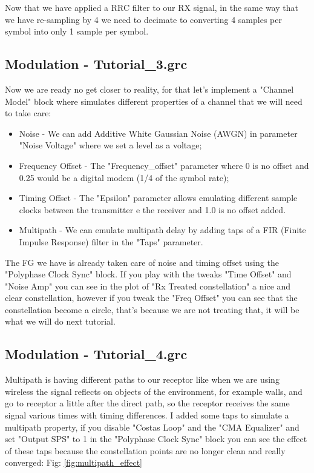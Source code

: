 \documentclass[a4paper, 10pt, conference]{ieeeconf}      %
\begin{document}
    Now that we have applied a RRC filter to our RX signal, in the same way that we have re-sampling by 4 we need to decimate to converting 4 samples per symbol into only 1 sample per symbol.

\subsection{Modulation - Tutorial\_3.grc}
    Now we are ready no get closer to reality, for that let's implement a "Channel Model" block where simulates different properties of a channel that we will need to take care:
    
\begin{itemize}
\item Noise - We can add Additive White Gaussian Noise (AWGN) in parameter "Noise Voltage" where we set a level as a voltage;
\item Frequency Offset - The "Frequency\_offset" parameter where 0 is no offset and 0.25 would be a digital modem (1/4 of the symbol rate);
\item Timing Offset - The "Epsilon" parameter allows emulating different sample clocks between the transmitter e the receiver and 1.0 is no offset added.
\item Multipath - We can emulate multipath delay by adding taps of a FIR (Finite Impulse Response) filter in the "Taps" parameter.
\end{itemize}
    
    
    The FG we have is already taken care of noise and timing offset using the "Polyphase Clock Sync" block. If you play with the tweaks "Time Offset" and "Noise Amp" you can see in the plot of "Rx Treated constellation" a nice and clear constellation, however if you tweak the "Freq Offset" you can see that the constellation become a circle, that's because we are not treating that, it will be what we will do next tutorial.
    
\subsection{Modulation - Tutorial\_4.grc}
    Multipath is having different paths to our receptor like when we are using wireless the signal  reflects on objects of the environment, for example walls, and go to receptor a little after the direct path, so the receptor receives the same signal various times with timing differences. 
    I added some taps to simulate a multipath property, if you disable "Costas Loop" and the "CMA Equalizer" and set "Output SPS" to 1 in the "Polyphase Clock Sync" block you can see the effect of these taps because the constellation points are no longer clean and really converged: Fig: \ref{fig:multipath_effect}
\end{document}
